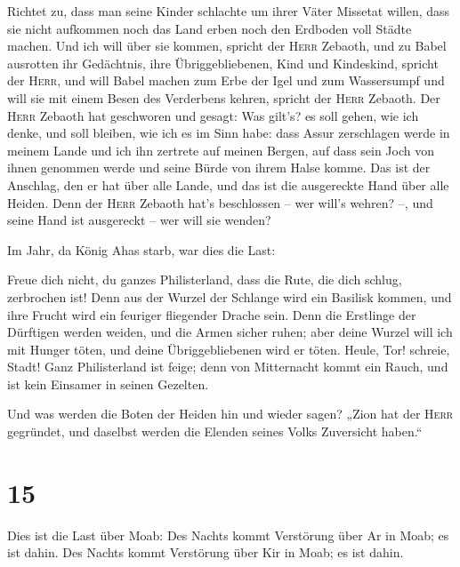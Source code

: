  Richtet zu, dass man seine Kinder schlachte um ihrer
Väter Missetat willen, dass sie nicht aufkommen noch das Land erben noch
den Erdboden voll Städte machen.  Und ich will über sie
kommen, spricht der \textsc{Herr} Zebaoth, und zu Babel ausrotten ihr
Gedächtnis, ihre Übriggebliebenen, Kind und Kindeskind, spricht der
\textsc{Herr},  und will Babel machen zum Erbe der Igel
und zum Wassersumpf und will sie mit einem Besen des Verderbens kehren,
spricht der \textsc{Herr} Zebaoth.  Der \textsc{Herr}
Zebaoth hat geschworen und gesagt: Was gilt's? es soll gehen, wie ich
denke, und soll bleiben, wie ich es im Sinn habe:  dass
Assur zerschlagen werde in meinem Lande und ich ihn zertrete auf meinen
Bergen, auf dass sein Joch von ihnen genommen werde und seine Bürde von
ihrem Halse komme.  Das ist der Anschlag, den er hat über
alle Lande, und das ist die ausgereckte Hand über alle Heiden.
 Denn der \textsc{Herr} Zebaoth hat's beschlossen -- wer
will's wehren? --, und seine Hand ist ausgereckt -- wer will sie wenden?

 Im Jahr, da König Ahas starb, war dies die Last:

 Freue dich nicht, du ganzes Philisterland, dass die
Rute, die dich schlug, zerbrochen ist! Denn aus der Wurzel der Schlange
wird ein Basilisk kommen, und ihre Frucht wird ein feuriger fliegender
Drache sein.  Denn die Erstlinge der Dürftigen werden
weiden, und die Armen sicher ruhen; aber deine Wurzel will ich mit
Hunger töten, und deine Übriggebliebenen wird er töten. 
Heule, Tor! schreie, Stadt! Ganz Philisterland ist feige; denn von
Mitternacht kommt ein Rauch, und ist kein Einsamer in seinen Gezelten.

 Und was werden die Boten der Heiden hin und wieder
sagen? „Zion hat der \textsc{Herr} gegründet, und daselbst werden die
Elenden seines Volks Zuversicht haben.``

\hypertarget{section-14}{%
\section{15}\label{section-14}}

 Dies ist die Last über Moab: Des Nachts kommt Verstörung
über Ar in Moab; es ist dahin. Des Nachts kommt Verstörung über Kir in
Moab; es ist dahin.

